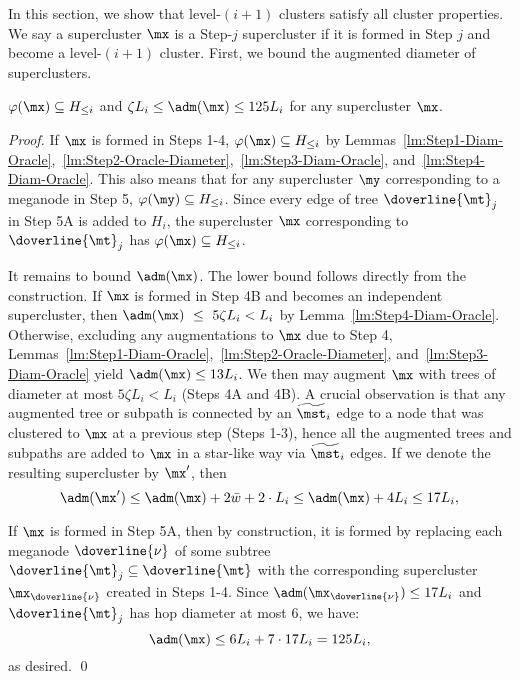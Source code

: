 In this section, we show that level-$(i+1)$ clusters satisfy all cluster properties. We say a supercluster $\mx$ is a Step-$j$ supercluster if it is formed in Step $j$ and become a level-$(i+1)$ cluster. First, we bound the augmented diameter of superclusters. 

\begin{lemma}\label{lm:Diameter-Up} $\varphi(\mx)\subseteq H_{\leq i}$ and $\zeta L_i \leq \adm(\mx) \leq  125L_i$ for any supercluster $\mx$. 
\end{lemma}
\begin{proof}
	If $\mx$ is formed in Steps 1-4, $\varphi(\mx)\subseteq H_{\leq i}$ by 
	Lemmas~\ref{lm:Step1-Diam-Oracle},~\ref{lm:Step2-Oracle-Diameter},~\ref{lm:Step3-Diam-Oracle}, and~\ref{lm:Step4-Diam-Oracle}. This also means that for any supercluster $\my$ corresponding to a meganode in Step 5, $\varphi(\my)\subseteq H_{\leq i}$. Since every edge of tree $\doverline{\mt}_j$ in Step 5A is added to $H_i$, the supercluster $\mx$ corresponding to  $\doverline{\mt}_j$ has $\varphi(\mx)\subseteq H_{\leq i}$. 
	
	It remains to bound $\adm(\mx)$. The lower bound follows directly from the construction.	 If $\mx$ is formed in Step 4B and becomes an independent supercluster,  then $\adm(\mx)~\leq~ 5\zeta L_i < L_i$ by Lemma~\ref{lm:Step4-Diam-Oracle}. Otherwise, excluding any augmentations to $\mx$ due to Step 4, Lemmas~\ref{lm:Step1-Diam-Oracle},~\ref{lm:Step2-Oracle-Diameter}, and~\ref{lm:Step3-Diam-Oracle} yield $\adm(\mx) \leq 13L_i$. We then may augment $\mx$ with trees of diameter at most $5\zeta L_i < L_i$ (Steps 4A and 4B). A crucial observation is that any augmented tree or subpath is connected by an $\widetilde{\mst}_i$ edge to a node that was clustered to $\mx$ at a previous step (Steps 1-3), hence all the augmented trees and subpaths are added to $\mx$ in a star-like way via $\widetilde{\mst}_i$ edges. If we denote the resulting supercluster by $\mx'$, then 
	\begin{equation*}
	\adm(\mx') \leq \adm(\mx) + 2\bar{w} + 2\cdot L_i \leq \adm(\mx) + 4L_i  \leq 17L_i, \end{equation*}
	
	
	If $\mx$ is formed in Step 5A, then by construction, it is formed by replacing each meganode $\doverline{\nu}$ of some subtree $\doverline{\mt}_j\subseteq \doverline{\mt}$ with the corresponding supercluster $\mx_{\doverline{\nu}}$ created in Steps 1-4. Since $\adm(\mx_{\doverline{\nu}})\leq 17 L_i$ and $\doverline{\mt}_j$ has hop diameter at most $6$, we have:
	\begin{equation*}
	\adm(\mx)\leq 6L_i + 7\cdot 17L_i = 125 L_i,
	\end{equation*}
	as desired.	\qed
\end{proof}

